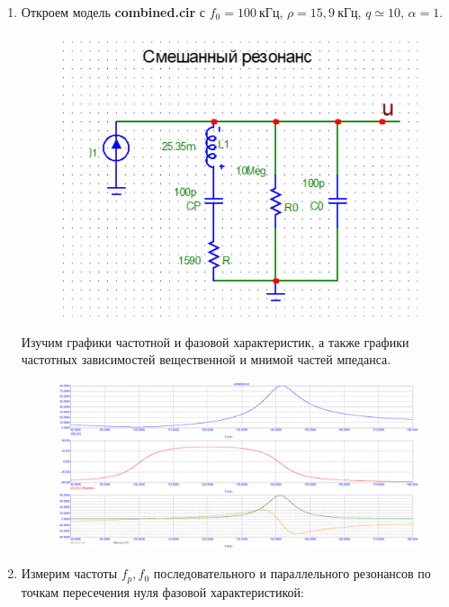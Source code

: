 \documentclass[a4paper, 12pt]{article}%
\begin{document}
\begin{enumerate}

\item Откроем модель \textbf{combined.cir} с $f_0 = 100 \: \textit{кГц}$, $\rho = 15,9 \: \textit{кГц}$, $q \simeq 10$, $\alpha = 1$.

\begin{figure}[h!]
\centering
\includegraphics[scale=0.4]{combined_img.png}
\label{fig:Image1}
\end{figure}

Изучим графики частотной и фазовой характеристик, а также графики частотных зависимостей вещественной и мнимой частей мпеданса.

\begin{figure}[h!]
\centering
\includegraphics[scale=0.4]{combined_AC1.png}
\label{fig:Image1}
\end{figure}

\item Измерим частоты $f_p, f_0$ последовательного и параллельного резонансов по точкам пересечения нуля фазовой характеристикой:


\end{enumerate}
\end{document}
